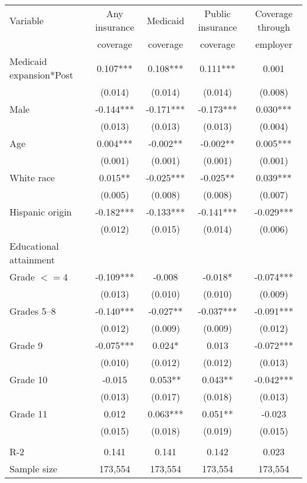 \begin{tabular}{lcccc}
\toprule
\toprule
 Variable & Any insurance & Medicaid & Public insurance & Coverage through \\
  & coverage & coverage & coverage &  employer \\
\midrule 
 Medicaid expansion*Post   & 0.107***   & 0.108***   & 0.111***   & 0.001  \\
 & (0.014)   & (0.014)   & (0.014)   & (0.008)  \\
 Male   & -0.144***   & -0.171***   & -0.173***   & 0.030***  \\
 & (0.013)   & (0.013)   & (0.013)   & (0.004)  \\
 Age   & 0.004***   & -0.002**   & -0.002**   & 0.005***  \\
 & (0.001)   & (0.001)   & (0.001)   & (0.001)  \\
 White race   & 0.015**   & -0.025***   & -0.025**   & 0.039***  \\
 & (0.005)   & (0.008)   & (0.008)   & (0.007)  \\
 Hispanic origin   & -0.182***   & -0.133***   & -0.141***   & -0.029***  \\
 & (0.012)   & (0.015)   & (0.014)   & (0.006)  \\
 Educational attainment  \\
 \hspace{0.3cm} Grade $<=$4   & -0.109***   & -0.008   & -0.018*   & -0.074***  \\
 & (0.013)   & (0.010)   & (0.010)   & (0.009)  \\
 \hspace{0.3cm}  Grades 5--8   & -0.140***   & -0.027**   & -0.037***   & -0.091***  \\
 & (0.012)   & (0.009)   & (0.009)   & (0.012)  \\
 \hspace{0.3cm} Grade 9   & -0.075***   & 0.024*   & 0.013   & -0.072***  \\
 & (0.010)   & (0.012)   & (0.012)   & (0.013)  \\
 \hspace{0.3cm} Grade 10   & -0.015   & 0.053**   & 0.043**   & -0.042***  \\
 & (0.013)   & (0.017)   & (0.018)   & (0.013)  \\
 \hspace{0.3cm} Grade 11   & 0.012   & 0.063***   & 0.051**   & -0.023  \\
 & (0.015)   & (0.018)   & (0.019)   & (0.015)  \\
\\
R-2 & 0.141 & 0.141 & 0.142 & 0.023 \\
Sample size & 173,554 & 173,554 & 173,554 & 173,554 \\
\bottomrule
\bottomrule
\end{tabular}
